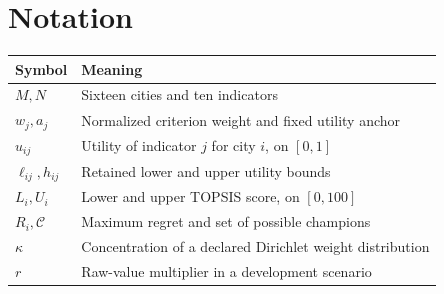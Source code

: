 \section{Notation}
\begin{tabular}{p{.18\linewidth}p{.75\linewidth}}
\toprule Symbol & Meaning\\\midrule
$M,N$ & Sixteen cities and ten indicators\\
$w_j,a_j$ & Normalized criterion weight and fixed utility anchor\\
$u_{ij}$ & Utility of indicator $j$ for city $i$, on $[0,1]$\\
$\ell_{ij},h_{ij}$ & Retained lower and upper utility bounds\\
$L_i,U_i$ & Lower and upper TOPSIS score, on $[0,100]$\\
$R_i,\mathcal C$ & Maximum regret and set of possible champions\\
$\kappa$ & Concentration of a declared Dirichlet weight distribution\\
$r$ & Raw-value multiplier in a development scenario\\\bottomrule
\end{tabular}

